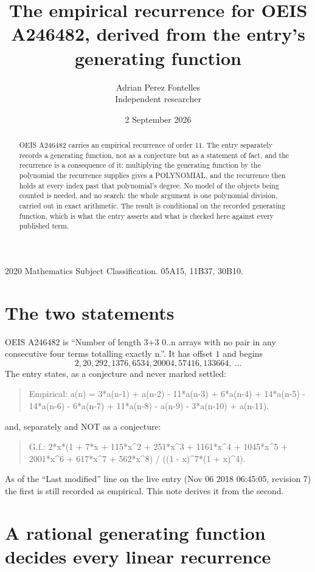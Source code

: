 \documentclass[11pt,a4paper]{article}
\title{The empirical recurrence for OEIS A246482, derived from the entry's generating function}
\author{Adrian Perez Fontelles\\ \small Independent researcher}
\date{2 September 2026}
\theoremstyle{plain}
\theoremstyle{definition}
\begin{document}
\maketitle

\begin{abstract}
OEIS A246482 carries an empirical recurrence of order $11$. The entry separately records a
generating function, not as a conjecture but as a statement of fact, and the recurrence is a
consequence of it: multiplying the generating function by the polynomial the recurrence
supplies gives a POLYNOMIAL, and the recurrence then holds at every index past that
polynomial's degree. No model of the objects being counted is needed, and no search: the
whole argument is one polynomial division, carried out in exact arithmetic. The result is
conditional on the recorded generating function, which is what the entry asserts and what is
checked here against every published term.
\end{abstract}

\noindent\small 2020 Mathematics Subject Classification. 05A15, 11B37, 30B10.\normalsize

\section{The two statements}

OEIS A246482 is ``Number of length 3+3 0..n arrays with no pair in any consecutive four terms totalling exactly n.''. It has offset $1$ and begins
\[
2, 20, 292, 1376, 6534, 20004, 57416, 133664,\ \dots
\]
The entry states, as a conjecture and never marked settled:
\begin{quote}
Empirical: a(n) = 3*a(n-1) + a(n-2) - 11*a(n-3) + 6*a(n-4) + 14*a(n-5) - 14*a(n-6) - 6*a(n-7) + 11*a(n-8) - a(n-9) - 3*a(n-10) + a(n-11).
\end{quote}
and, separately and NOT as a conjecture:
\begin{quote}
G.f.: 2*x*(1 + 7*x + 115*x\^{}2 + 251*x\^{}3 + 1161*x\^{}4 + 1045*x\^{}5 + 2001*x\^{}6 + 617*x\^{}7 + 562*x\^{}8) / ((1 - x)\^{}7*(1 + x)\^{}4).
\end{quote}
As of the ``Last modified'' line on the live entry (Nov 06 2018 06:45:05, revision 7) the first is still
recorded as empirical. This note derives it from the second.

\section{A rational generating function decides every linear recurrence}
\end{document}
